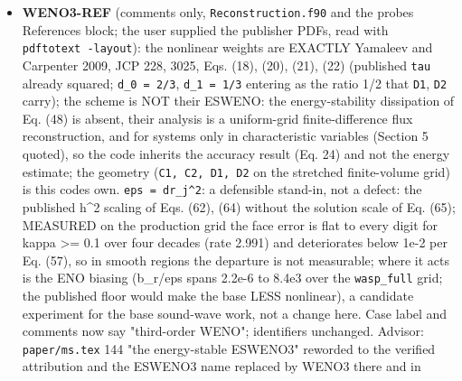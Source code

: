 \documentclass[english,a4paper]{my_memo}
\begin{document}
\begin{itemize}
{  OWN optical depth}, which enters its own field only on the next pass
  (contraction 0.17): closing it means the cell residual carries its own
  field, \texttt{System\_HeH*}, i.e. B5. Folded: the pre-sweep \texttt{eval\_cool} run for
  its coefficients only is now \texttt{chemical\_rate\_coefficients} (-3.6 percent
  \texttt{wasp\_full}, -5.6 percent \texttt{mol\_metals}, +3.5 percent \texttt{mol\_base\_handoff},
  the last from the 27 metal slots looped with metals off: guard on
  \texttt{thereis\_metals}, HYG-COL). Recorded: \texttt{docs/openmp\_parallelization.md}
  (2.07x at 16 threads, bit-identical across threads) is stale: measured 8.2x
  and round-off 6.6e-14 (DOCS-OMP). A \texttt{cp\ -irp} of another item blocked on an
  interactive prompt since 2026-09-06 was killed by PID (23818, cwd checked).
\item
  \textbf{WENO3-REF} (comments only, \texttt{Reconstruction.f90} and the probe\textquotesingle s
  References block; the user supplied the publisher PDFs, read with
  \texttt{pdftotext\ -layout}): the nonlinear weights are EXACTLY Yamaleev and
  Carpenter 2009, JCP 228, 3025, Eqs. (18), (20), (21), (22) (published
  \texttt{tau} already squared; \texttt{d\_0\ =\ 2/3}, \texttt{d\_1\ =\ 1/3} entering as the ratio 1/2
  that \texttt{D1}, \texttt{D2} carry); the scheme is NOT their ESWENO: the energy-stability
  dissipation of Eq. (48) is absent, their analysis is a uniform-grid
  finite-difference flux reconstruction, and for systems only in
  characteristic variables (Section 5 quoted), so the code inherits the
  accuracy result (Eq. 24) and not the energy estimate; the geometry
  (\texttt{C1,\ C2,\ D1,\ D2} on the stretched finite-volume grid) is this code\textquotesingle s own.
  \texttt{eps\ =\ dr\_j\^{}2}: a defensible stand-in, not a defect: the published h\^{}2
  scaling of Eqs. (62), (64) without the solution scale of Eq. (65);
  MEASURED on the production grid the face error is flat to every digit for
  kappa \textgreater= 0.1 over four decades (rate 2.991) and deteriorates below 1e-2
  per Eq. (57), so in smooth regions the departure is not measurable; where
  it acts is the ENO biasing (b\_r/eps spans 2.2e-6 to 8.4e3 over the
  \texttt{wasp\_full} grid; the published floor would make the base LESS nonlinear),
  a candidate experiment for the base sound-wave work, not a change here.
  Case label and comments now say "third-order WENO"; identifiers unchanged.
  Advisor: \texttt{paper/ms.tex} 144 "the energy-stable ESWENO3" reworded to the
  verified attribution and the ESWENO3 name replaced by WENO3 there and in

\end{itemize}
\end{document}
